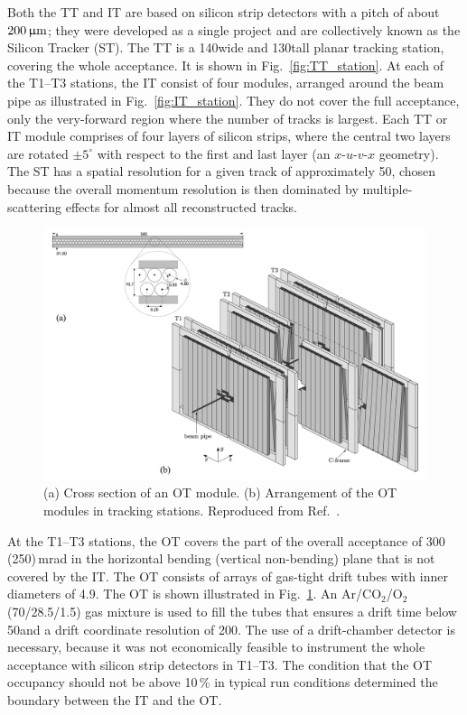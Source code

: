 Both the TT and IT are based on silicon strip detectors with a pitch of about $200\,\upmu\text{m}$; they were developed as a single project and are collectively known as the Silicon Tracker (ST). The TT  is a 140\cm wide and 130\cm tall planar tracking station, covering the whole \lhcb acceptance. It is shown in Fig.~\ref{fig:TT_station}. At each of the T1--T3 stations,  the IT consist of four modules, arranged around the beam pipe as illustrated in Fig.~\ref{fig:IT_station}. They do not cover the full \lhcb acceptance, only the very-forward region where the number of tracks is largest. Each TT or IT module comprises of four layers of silicon strips, where the central two layers are rotated $\pm5^\circ$ with respect to the first and last layer (an $x$-$u$-$v$-$x$ geometry). The ST has a spatial resolution for a given track of approximately 50\mum, chosen because the overall momentum resolution is then dominated by multiple-scattering effects for almost all reconstructed tracks.

\begin{figure}[tb]
    \centering
    \includegraphics[width=\columnwidth]{figures/detector/OT_stations.png}
    \caption{(a) Cross section of an OT module. (b) Arrangement of the OT modules in tracking stations. Reproduced from Ref.~\cite{OT-Performance}.}
    \label{fig:OT_station}
\end{figure}

At the T1--T3 stations, the OT covers the part of the overall acceptance of 300 (250)\,mrad in the horizontal bending (vertical non-bending) plane that is not covered by the IT. The OT consists of arrays of gas-tight drift tubes with inner diameters of 4.9\mm. The OT is shown illustrated in Fig.~\ref{fig:OT_station}. An Ar/CO$_2$/O$_2$ (70/28.5/1.5) gas mixture is used to fill the tubes that ensures a drift time below 50\ns and a drift coordinate resolution of 200\mum. The use of a drift-chamber detector is necessary, because it was not economically feasible to instrument the whole \lhcb acceptance with silicon strip detectors in T1--T3. The condition that the OT occupancy should not be above 10\,\% in typical run conditions determined the boundary between the IT and the OT. 

